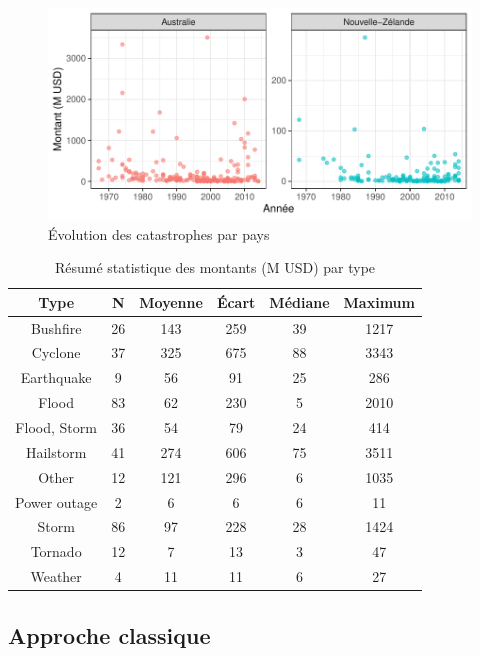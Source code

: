 \begin{frame}
\begin{figure}
\includegraphics[width=.8\textwidth]{images/fig-007.pdf}
\caption{Évolution des catastrophes par pays}
\end{figure}
\end{frame}


\begin{frame}
\begin{table}[ht]
\centering
\begin{tabular}{cccccc}
  \hline
Type & N & Moyenne & Écart & Médiane & Maximum \\ 
  \hline
Bushfire & 26 & 143 & 259 & 39 & 1217 \\ 
  Cyclone & 37 & 325 & 675 & 88 & 3343 \\ 
  Earthquake & 9 & 56 & 91 & 25 & 286 \\ 
  Flood & 83 & 62 & 230 & 5 & 2010 \\ 
  Flood, Storm & 36 & 54 & 79 & 24 & 414 \\ 
  Hailstorm & 41 & 274 & 606 & 75 & 3511 \\ 
  Other & 12 & 121 & 296 & 6 & 1035 \\ 
  Power outage & 2 & 6 & 6 & 6 & 11 \\ 
  Storm & 86 & 97 & 228 & 28 & 1424 \\ 
  Tornado & 12 & 7 & 13 & 3 & 47 \\ 
  Weather & 4 & 11 & 11 & 6 & 27 \\ 
   \hline
\end{tabular}
\caption{Résumé statistique des montants (M USD) par type} 
\label{tab:3.6}
\end{table}\end{frame}

\subsection{Approche classique}

